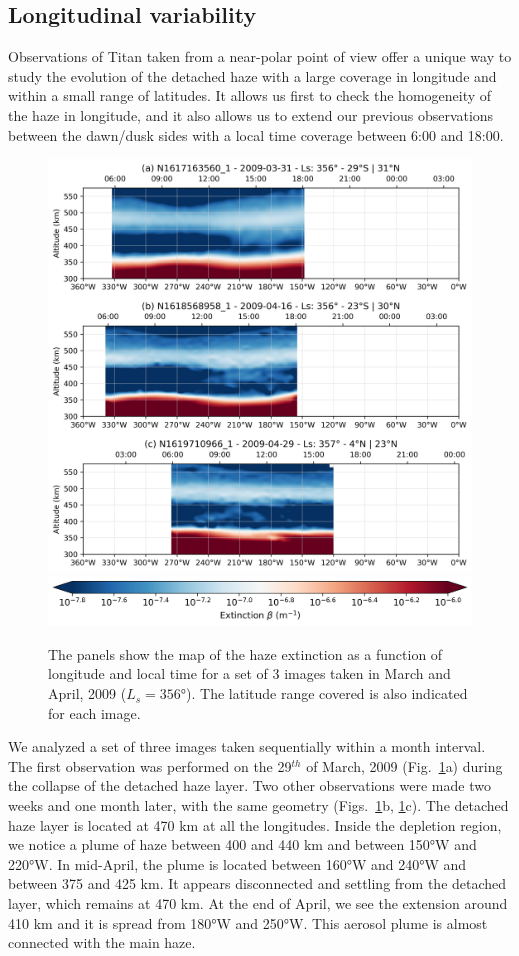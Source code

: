 \subsection{Longitudinal variability}

Observations of Titan taken from a near-polar point of view offer a unique way to study the evolution of
the detached haze with a large coverage in longitude and within a small range of latitudes. It allows us
first to check the homogeneity of the haze in longitude, and it also allows us to extend our previous
observations between the dawn/dusk sides with a local time coverage between 6:00 and 18:00.

\begin{figure}[!ht]
    \centering
    \includegraphics[width=.8\textwidth]{Fig/Lon_variability.png}
    \includegraphics[width=.5\textwidth]{Fig/Extinction_colorbar.png}\vspace{-.3cm}
    \caption{The panels show the map of the haze extinction as a function of longitude and local
    time for a set of 3 images taken in March and April, 2009 ($L_s=\ang{356}$). The latitude range covered is
    also indicated for each image.}
    \label{fig:lon_variability}
\end{figure}

We analyzed a set of three images taken sequentially within a month interval. The first observation
was performed on the 29$^{th}$ of March, 2009 (Fig.~\ref{fig:lon_variability}a) during the collapse of the detached
haze layer. Two other observations were made two weeks and one month later, with the same geometry
(Figs.~\ref{fig:lon_variability}b, \ref{fig:lon_variability}c). The detached haze layer is
located at 470 km at all the longitudes. Inside the depletion region, we notice a plume of haze
between 400 and 440 km and between \ang{150}W and \ang{220}W. In mid-April, the plume is located between
\ang{160}W and \ang{240}W and between 375 and 425 km. It appears disconnected and settling from the detached
layer, which remains at 470 km. At the end of April, we see the extension around 410 km and it
is spread from \ang{180}W and \ang{250}W. This aerosol plume is almost connected with the main haze.

